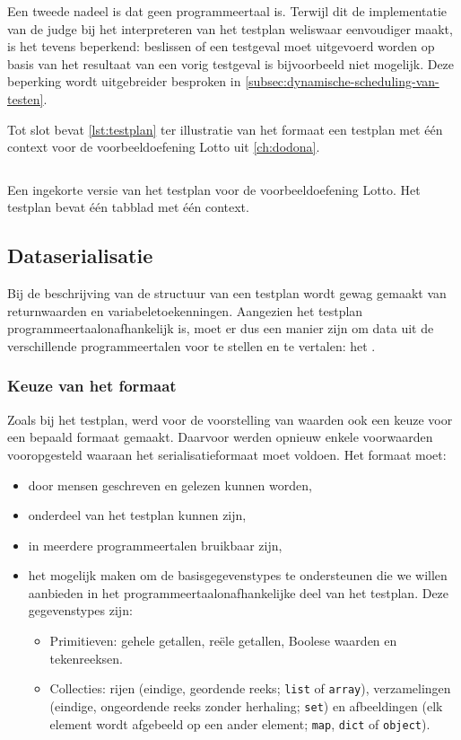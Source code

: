 Een tweede nadeel is dat  geen programmeertaal is.
Terwijl dit de implementatie van de judge bij het interpreteren van het testplan weliswaar eenvoudiger maakt, is het tevens beperkend: beslissen of een testgeval moet uitgevoerd worden op basis van het resultaat van een vorig testgeval is bijvoorbeeld niet mogelijk.
Deze beperking wordt uitgebreider besproken in \cref{subsec:dynamische-scheduling-van-testen}.

Tot slot bevat \cref{lst:testplan} ter illustratie van het formaat een testplan met één context voor de voorbeeldoefening Lotto uit \cref{ch:dodona}.

\begin{listing}
    \inputminted{python}{code/testplan.json}
    \caption{
        Een ingekorte versie van het testplan voor de voorbeeldoefening Lotto.
        Het testplan bevat één tabblad met één context.
    }
    \label{lst:testplan}
\end{listing}

\subsection{Dataserialisatie}\label{subsec:dataserialisatie}

Bij de beschrijving van de structuur van een testplan wordt gewag gemaakt van returnwaarden en variabeletoekenningen.
Aangezien het testplan programmeertaalonafhankelijk is, moet er dus een manier zijn om data uit de verschillende programmeertalen voor te stellen en te vertalen: het .

\subsubsection{Keuze van het formaat}

Zoals bij het testplan, werd voor de voorstelling van waarden ook een keuze voor een bepaald formaat gemaakt.
Daarvoor werden opnieuw enkele voorwaarden vooropgesteld waaraan het serialisatieformaat moet voldoen.
Het formaat moet:

\begin{itemize}
    \item door mensen geschreven en gelezen kunnen worden,
    \item onderdeel van het testplan kunnen zijn,
    \item in meerdere programmeertalen bruikbaar zijn,
    \item het mogelijk maken om de basisgegevenstypes te ondersteunen die we willen aanbieden in het programmeertaalonafhankelijke deel van het testplan.
    Deze gegevenstypes zijn:
    \begin{itemize}
        \item Primitieven: gehele getallen, reële getallen, Boolese waarden en tekenreeksen.
        \item Collecties: rijen (eindige, geordende reeks; \texttt{list} of \texttt{array}), verzamelingen (eindige, ongeordende reeks zonder herhaling; \texttt{set}) en afbeeldingen (elk element wordt afgebeeld op een ander element; \texttt{map}, \texttt{dict} of \texttt{object}).
    \end{itemize}
\end{itemize}

